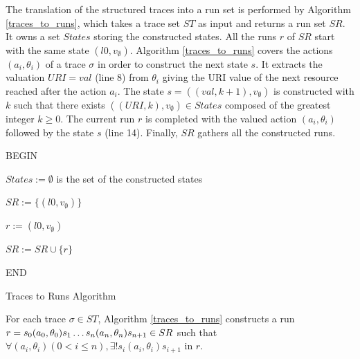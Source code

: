 The translation of the structured traces into a run set is
performed by Algorithm \ref{traces_to_runs}, which takes a
trace set $ST$ as input and returns a run set $SR$. It owns a
set $States$ storing the constructed states. All the runs $r$ of
$SR$ start with the same state $(l0,v_\emptyset)$. Algorithm
\ref{traces_to_runs} covers the actions $(a_i,\theta_i)$ of a
trace $\sigma$ in order to construct the next state $s$. It
extracts the valuation $URI=val$ (line 8) from $\theta_i$ giving
the URI value of the next resource reached after the action
$a_i$. The state $s=((val,k+1),v_\emptyset)$ is constructed with
$k$ such that there exists $((URI,k),v_\emptyset) \in States$
composed of the greatest integer $k \geq 0$. The current run $r$
is completed with the valued action $(a_i,\theta_i)$ followed by
the state $s$ (line 14). Finally, $SR$ gathers all the
constructed runs.

\begin{algorithm}
 


BEGIN\;

$States:=\emptyset$ is the set of the constructed states\;

 {
$SR:= \{(l0,v_\emptyset)\}$}

 {
$r:= (l0,v_\emptyset)$\;


$SR:=SR \cup \{r\}$

}%

END\;

    \caption{Traces to Runs Algorithm}
    \label{traces_to_runs}
\end{algorithm}

\begin{proposition}
For each trace $\sigma \in ST$, Algorithm \ref{traces_to_runs}
constructs a run $r=s_0(a_0,\theta_0)s_1 \dots
\\s_n(a_n,\theta_n)s_{n+1} \in SR$ such that $\forall
(a_i,\theta_i) ( 0<i\leq n), \exists ! s_i(a_i,\theta_i)s_{i+1}$
in $r$.
\end{proposition}

